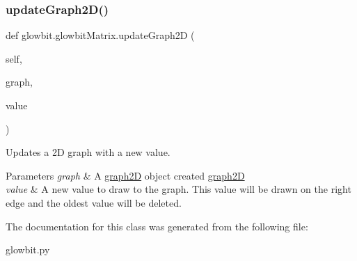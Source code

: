 \subsubsection{\texorpdfstring{update\+Graph2\+D()}{updateGraph2D()}}
{\footnotesize\ttfamily def glowbit.\+glowbit\+Matrix.\+update\+Graph2D (\begin{DoxyParamCaption}\item[{}]{self,  }\item[{}]{graph,  }\item[{}]{value }\end{DoxyParamCaption})}



Updates a 2D graph with a new value. 


\begin{DoxyParams}{Parameters}
{\em graph} & A \hyperlink{classglowbit_1_1glowbitMatrix_1_1graph2D}{graph2D} object created \hyperlink{classglowbit_1_1glowbitMatrix_1_1graph2D}{graph2D} \\
\hline
{\em value} & A new value to draw to the graph. This value will be drawn on the right edge and the oldest value will be deleted. \\
\hline
\end{DoxyParams}


The documentation for this class was generated from the following file\+:\begin{DoxyCompactItemize}
\item 
glowbit.\+py\end{DoxyCompactItemize}
